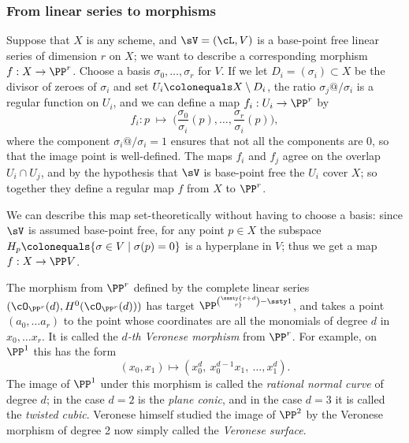 \subsubsection*{From linear series to morphisms}

Suppose  that $X$ is any scheme, and $\sV = (\cL, V)$ is a base-point
free linear series of dimension $r$ on $X$; we want to describe a
corresponding morphism $f : X \to \PP^r$. Choose a basis $\sigma_0,
\dots, \sigma_r$ for $V$. If we let $D_i = (\sigma_i) \subset X$ be
the divisor of zeroes of $\sigma_i$ and
set
$U_i \colonequals X \setminus D_i$,
the ratio $\sigma_j@/\sigma_i$ is a regular function on $U_i$, and
we can define a map $f_i : U_i \to \PP^r$ by
$$
f_i : p \; \mapsto \; \Big(\frac{\sigma_0}{\sigma_i}(p), \dots, \frac{\sigma_r}{\sigma_i}(p)\Big),
$$
where the component $\sigma_i@/\sigma_i = 1$ ensures that not all the components are 0, so that the image point is well-defined.
The maps $f_i$ and $f_j$ agree on the overlap $U_i \cap U_j$, and by the hypothesis that $\sV$ is base-point free the $U_i$ cover $X$;
so together they define a regular map $f$ from $X$ to $\PP^r$.

We can describe this map set-theoretically without having to choose a
basis: since $\sV$ is assumed base-point free, for any point $p \in X$
the subspace $H_p \colonequals \{ \sigma \in V \mid \sigma(p) = 0 \}$
is a hyperplane in $V$; thus we get a map $f : X \to \PP V$.

\begin{example}\label{Veronese definition}
The morphism
\vspace*{-2pt}%
from $\PP^r$ defined by the complete linear series
$(\cO_{\PP^r}(d), H^0(\cO_{\PP^r}(d)))$ has target
$\PP^{\sssty{r+d\choose r}-\ssty 1}$,
and takes a point $(a_0,\dots a_r)$ to the point whose coordinates are all the monomials of
degree $d$ in $x_0,\dots x_r$. It is called the \emph{$d$-th Veronese morphism} from $\PP^r$. For example, on $\PP^1$ this has the form
%
%
$$
(x_0,x_1) \mapsto (x_0^d,\ x_0^{d-1}x_1,\ \dots,x_1^d).
$$
The image of $\PP^1$ under this morphism is called
%
%
%
%
%
the
\emph{rational normal curve}
of degree $d$; in the case $d=2$ is the
\emph{plane conic}, and in the case $d=3$ it is called the
\emph{twisted cubic}.
Veronese himself studied the image of $\PP^2$
by the Veronese morphism of degree 2 now simply called the
\emph{Veronese surface}.
\end{example}


